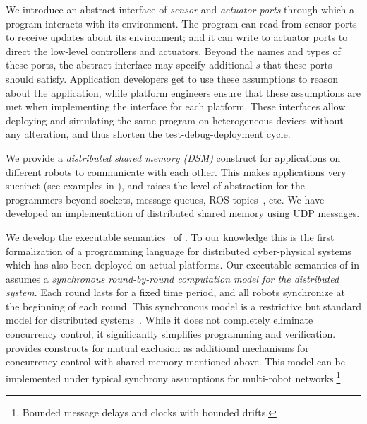 \begin{noinditem}
\item We introduce an abstract interface of \emph{sensor} and \emph{actuator ports} through which a \lgname program interacts with its environment.
The program can read from sensor ports to receive updates about its environment;
and it can write to actuator ports to direct the low-level controllers and actuators.
Beyond the names and types of these ports, the abstract interface may specify additional \emph{\portasum{}s} that these ports should satisfy.
Application developers get to use these assumptions to reason about the \lgname application,
while platform engineers ensure that these assumptions are met when implementing the interface for each platform.
These interfaces allow deploying and simulating the same \lgname program on heterogeneous devices without any alteration,
and thus shorten the test-debug-deployment cycle.

\item We provide a \emph{distributed shared memory (DSM)} construct for \lgname applications on different robots to communicate with each other.
This makes \lgname applications very succinct (see examples in ),
and raises the level of abstraction for the programmers beyond sockets, message queues, ROS topics~\cite{ros}, etc.
We have developed an implementation of distributed shared memory using UDP messages. %

\item We develop the executable \K semantics~\cite{rosu-serbanuta-2013-k} of \lgname.
To our knowledge this is the first formalization of a programming language for distributed cyber-physical systems which has also been deployed on actual platforms.
Our executable semantics of \lgname in \K assumes a \emph{synchronous round-by-round computation model for the distributed system}.
Each round lasts for a fixed time period, and all robots synchronize at the beginning of each round.
This synchronous model is a restrictive but standard model for distributed systems~\cite{lynch1996a,attiyawelch}.
While it does not completely eliminate concurrency control, it significantly simplifies programming and verification.
\lgname provides constructs for mutual exclusion as additional mechanisms for concurrency control with shared memory mentioned above.
This model can be implemented under typical synchrony assumptions for multi-robot networks.\footnote{Bounded message delays and clocks with bounded drifts.}


\end{noinditem}
